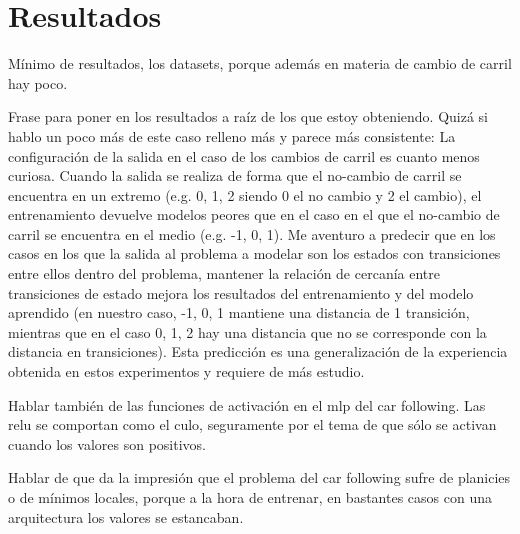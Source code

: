 \chapter{Resultados}
\label{ch:results}

Mínimo de resultados, los datasets, porque además en materia de cambio de carril hay poco.

Frase para poner en los resultados a raíz de los que estoy obteniendo. Quizá si hablo un poco más de este caso relleno más y parece más consistente: La configuración de la salida en el caso de los cambios de carril es cuanto menos curiosa. Cuando la salida se realiza de forma que el no-cambio de carril se encuentra en un extremo (e.g. 0, 1, 2 siendo 0 el no cambio y 2 el cambio), el entrenamiento devuelve modelos peores que en el caso en el que el no-cambio de carril se encuentra en el medio (e.g. -1, 0, 1). Me aventuro a predecir que en los casos en los que la salida al problema a modelar son los estados con transiciones entre ellos dentro del problema, mantener la relación de cercanía entre transiciones de estado mejora los resultados del entrenamiento y del modelo aprendido (en nuestro caso, -1, 0, 1 mantiene una distancia de 1 transición, mientras que en el caso 0, 1, 2 hay una distancia que no se corresponde con la distancia en transiciones). Esta predicción es una generalización de la experiencia obtenida en estos experimentos y requiere de más estudio.

Hablar también de las funciones de activación en el mlp del car following. Las relu se comportan como el culo, seguramente por el tema de que sólo se activan cuando los valores son positivos.

Hablar de que da la impresión que el problema del car following sufre de planicies o de mínimos locales, porque a la hora de entrenar, en bastantes casos con una arquitectura los valores se estancaban.